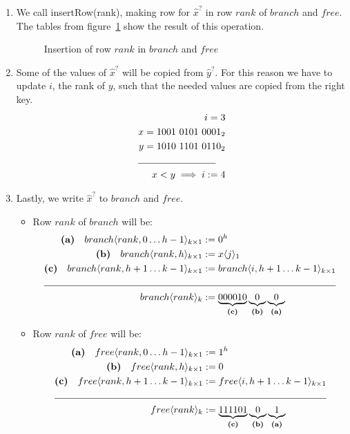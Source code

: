 \begin{enumerate}
    \item
    We call {\ttfamily insertRow(rank)}, making row for $\hat x^?$ in row $rank$ of $branch$ and $free$. The tables from figure~\ref{fig:insertRowRank} show the result of this operation.
    \begin{figure}[H]
    \centering
    
    \caption{Insertion of row $rank$ in $branch$ and $free$}
    \label{fig:insertRowRank}
    \end{figure}
    
    \item
    Some of the values of $\hat x^?$ will be copied from $\hat y^?$. For this reason we have to update $i$, the rank of $y$, such that the needed values are copied from the right key.
    \begin{align*}
        i = 3 \\
        x = 1001\ 0101\ 0001_2 \\
        y = 1010\ 1101\ 0110_2 \\
        \cline{1-2}
        x < y \implies i:= 4
    \end{align*}
    
    \item
    Lastly, we write $\hat x^?$ to $branch$ and $free$.
    \begin{itemize}
        \item
        Row $rank$ of $branch$ will be:
        \begin{align*}
            \textbf{(a)}\quad branch\langle rank, 0 \dots h - 1 \rangle_{k \times 1} &:= 0^h\\
            \textbf{(b)}\quad branch\langle rank, h\rangle_{k \times 1} &:= x\langle j \rangle_1\\
            \textbf{(c)}\quad branch\langle rank, h + 1 \dots k - 1\rangle_{k \times 1} &:= branch\langle i, h + 1 \dots k - 1\rangle_{k \times 1}\\
            \cline{1-2}
            branch\langle rank \rangle_k &:=\underbrace{000010}_{\textbf{(c)}} \underbrace{0}_{\textbf{(b)}} \underbrace{0}_{\textbf{(a)}}
        \end{align*}
        
        \item
        Row $rank$ of $free$ will be:
        \begin{align*}
            \textbf{(a)}\quad free\langle rank, 0 \dots h - 1 \rangle_{k \times 1} &:= 1^h \\
            \textbf{(b)}\quad free\langle rank, h\rangle_{k \times 1} &:= 0 \\
            \textbf{(c)}\quad free\langle rank, h + 1 \dots k - 1\rangle_{k \times 1} &:= free\langle i, h + 1 \dots k - 1\rangle_{k \times 1} \\
            \cline{1-2}
            free\langle rank \rangle_k &:=\underbrace{111101}_{\textbf{(c)}} \underbrace{0}_{\textbf{(b)}} \underbrace{1}_{\textbf{(a)}}
        \end{align*}
    \end{itemize}


\end{enumerate}

